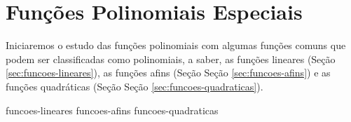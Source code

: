 \section{Funções Polinomiais Especiais}
\label{sec:funcoes-polinomiais-especiais}

Iniciaremos o estudo das funções polinomiais com algumas funções comuns que podem ser classificadas como
polinomiais, a saber, as funções lineares (Seção \ref{sec:funcoes-lineares}), 
as funções afins (Seção Seção \ref{sec:funcoes-afins}) e as funções quadráticas 
(Seção Seção \ref{sec:funcoes-quadraticas}).

{funcoes-lineares}
{funcoes-afins}
{funcoes-quadraticas}